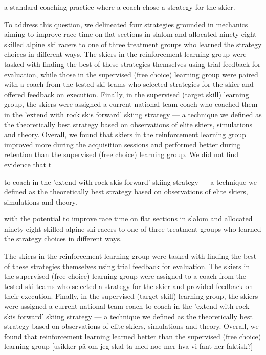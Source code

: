 a standard coaching practice where a coach chose a strategy for the skier.





To address this question, we delineated four strategies grounded in mechanics aiming to improve race time on flat sections in slalom and allocated ninety-eight skilled alpine ski racers to one of three treatment groups who learned the strategy choices in different ways. The skiers in the reinforcement learning group were tasked with finding the best of these strategies themselves using trial feedback for evaluation, while those in the supervised (free choice) learning group were paired with a coach from the tested ski teams who selected strategies for the skier and offered feedback on execution. Finally, in the supervised (target skill) learning group, the skiers were assigned a current national team coach who coached them in the 'extend with rock skis forward' skiing strategy — a technique we defined as the theoretically best strategy based on observations of elite skiers, simulations and theory. Overall, we found that skiers in the reinforcement learning group improved more during the acquisition sessions and performed better during retention than the supervised (free choice) learning group. We did not find evidence that t





to coach in the 'extend with rock skis forward' skiing strategy — a technique we defined as the theoretically best strategy based on observations of elite skiers, simulations and theory. 


with the potential to improve race time on flat sections in slalom and allocated ninety-eight skilled alpine ski racers to one of three treatment groups who learned the strategy choices in different ways.



The skiers in the reinforcement learning group were tasked with finding the best of these strategies themselves using trial feedback for evaluation. The skiers in the supervised (free choice) learning group were assigned to a coach from the tested ski teams who selected a strategy for the skier and provided feedback on their execution. Finally, in the supervised (target skill) learning group, the skiers were assigned a current national team coach to coach in the 'extend with rock skis forward' skiing strategy — a technique we defined as the theoretically best strategy based on observations of elite skiers, simulations and theory. Overall, we found that reinforcement learning learned better than the supervised (free choice) learning group [usikker på om jeg skal ta med noe mer hva vi fant her faktisk?]




